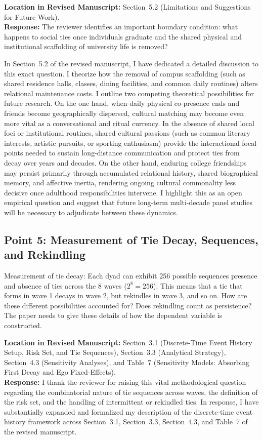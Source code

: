 \documentclass[11pt]{article}
\begin{document}
\noindent\textbf{Location in Revised Manuscript:} Section~5.2 (Limitations and Suggestions for Future Work).\\[4pt]
\textbf{Response:} The reviewer identifies an important boundary condition: what happens to social ties once individuals graduate and the shared physical and institutional scaffolding of university life is removed?

In Section~5.2 of the revised manuscript, I have dedicated a detailed discussion to this exact question. I theorize how the removal of campus scaffolding (such as shared residence halls, classes, dining facilities, and common daily routines) alters relational maintenance costs. I outline two competing theoretical possibilities for future research. On the one hand, when daily physical co-presence ends and friends become geographically dispersed, cultural matching may become even more vital as a conversational and ritual currency. In the absence of shared local foci or institutional routines, shared cultural passions (such as common literary interests, artistic pursuits, or sporting enthusiasm) provide the interactional focal points needed to sustain long-distance communication and protect ties from decay over years and decades. On the other hand, enduring college friendships may persist primarily through accumulated relational history, shared biographical memory, and affective inertia, rendering ongoing cultural commonality less decisive once adulthood responsibilities intervene. I highlight this as an open empirical question and suggest that future long-term multi-decade panel studies will be necessary to adjudicate between these dynamics.

\subsection*{Point 5: Measurement of Tie Decay, Sequences, and Rekindling}

\begin{reviewercomment}
Measurement of tie decay: Each dyad can exhibit 256 possible sequences presence and absence of ties across the 8 waves ($2^8 = 256$). This means that a tie that forms in wave 1 decays in wave 2, but rekindles in wave 3, and so on. How are these different possibilities accounted for? Does rekindling count as persistence? The paper needs to give these details of how the dependent variable is constructed.
\end{reviewercomment}

\noindent\textbf{Location in Revised Manuscript:} Section~3.1 (Discrete-Time Event History Setup, Risk Set, and Tie Sequences), Section~3.3 (Analytical Strategy), Section~4.3 (Sensitivity Analyses), and Table~7 (Sensitivity Models: Absorbing First Decay and Ego Fixed-Effects).\\[4pt]
\textbf{Response:} I thank the reviewer for raising this vital methodological question regarding the combinatorial nature of tie sequences across waves, the definition of the risk set, and the handling of intermittent or rekindled ties. In response, I have substantially expanded and formalized my description of the discrete-time event history framework across Section~3.1, Section~3.3, Section~4.3, and Table~7 of the revised manuscript.
\end{document}
